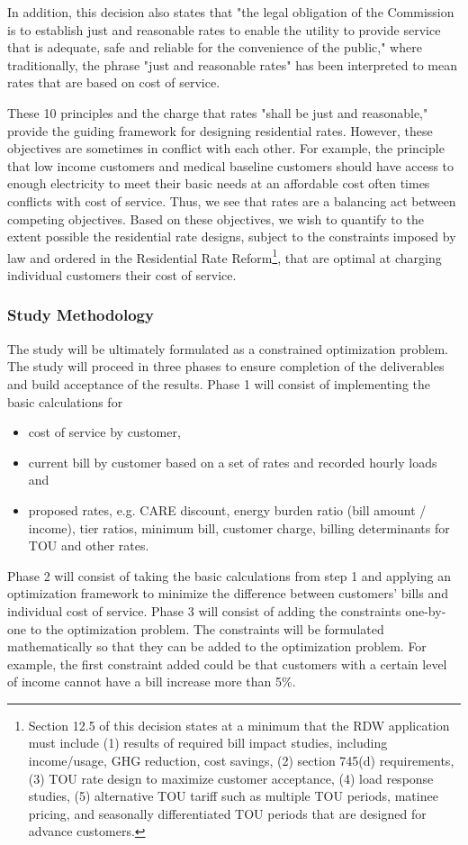 \documentclass[12pt]{article}
\begin{document}
In addition, this decision also states that "the legal obligation of the Commission is to establish just and reasonable rates to enable the utility to provide service that is adequate, safe and reliable for the convenience of the public," where traditionally, the phrase "just and reasonable rates" has been interpreted to mean rates that are based on cost of service.

These 10 principles and the charge that rates "shall be just and reasonable," provide the guiding framework for designing residential rates. However, these objectives are sometimes in conflict with each other. For example, the principle that low income customers and medical baseline customers should have access to enough electricity to meet their basic needs at an affordable cost often times conflicts with cost of service. Thus, we see that rates are a balancing act between competing objectives. Based on these objectives, we wish to quantify to the extent possible the residential rate designs, subject to the constraints imposed by law and ordered in the Residential Rate Reform\footnote{Section 12.5 of this decision states at a minimum that the RDW application must include (1) results of required bill impact studies, including income/usage, GHG reduction, cost savings, (2) section 745(d) requirements, (3) TOU rate design to maximize customer acceptance, (4) load response studies, (5) alternative TOU tariff such as multiple TOU periods, matinee pricing, and seasonally differentiated TOU periods that are designed for advance customers.}, that are optimal at charging individual customers their cost of service.

\subsubsection*{Study Methodology}

The study will be ultimately formulated as a constrained optimization problem. The study will proceed in three phases to ensure completion of the deliverables and build acceptance of the results. Phase 1 will consist of implementing the basic calculations for
\begin{itemize}
\item cost of service by customer,
\item current bill by customer based on a set of rates and recorded hourly loads and
\item proposed rates, e.g. CARE discount, energy burden ratio (bill amount / income), tier ratios, minimum bill, customer charge, billing determinants for TOU and other rates.
\end{itemize}
Phase 2 will consist of taking the basic calculations from step 1 and applying an optimization framework to minimize the difference between customers' bills and individual cost of service. Phase 3 will consist of adding the constraints one-by-one to the optimization problem. The constraints will be formulated mathematically so that they can be added to the optimization problem. For example, the first constraint added could be that customers with a certain level of income cannot have a bill increase more than 5\%.  
\end{document}
